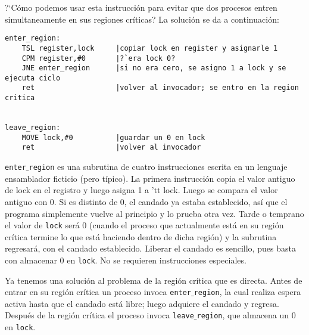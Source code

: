 \documentclass{article}
\begin{document}
?`C\'omo podemos usar esta instrucci\'on para evitar que dos procesos 
entren simultaneamente en sus regiones cr\'iticas? La soluci\'on se da a 
continuaci\'on:
\begin{verbatim}
enter_region:
    TSL register,lock     |copiar lock en register y asignarle 1
    CPM register,#0       |?`era lock 0?
    JNE enter_region      |si no era cero, se asigno 1 a lock y se ejecuta ciclo
    ret                   |volver al invocador; se entro en la region critica


leave_region:
    MOVE lock,#0          |guardar un 0 en lock
    ret                   |volver al invocador
\end{verbatim}
{\tt enter$\_$region} es una subrutina de cuatro instrucciones escrita 
en un lenguaje ensamblador ficticio (pero t\'ipico). La primera instrucci\'on 
copia el valor antiguo de lock en el registro y luego asigna 1 a {'tt lock}. 
Luego se compara el valor antiguo con 0. Si es distinto de 0, el candado ya 
estaba establecido, as\'i que el programa simplemente vuelve al principio 
y lo prueba otra vez. Tarde o temprano el valor de {\tt lock} ser\'a 0 
(cuando el proceso que actualmente est\'a en su regi\'on cr\'itica termine 
lo que est\'a haciendo dentro de dicha regi\'on) y la subrutina regresar\'a, 
con el candado establecido. Liberar el candado es sencillo, pues basta con 
almacenar 0 en {\tt lock}. No se requieren instrucciones especiales.

Ya tenemos una soluci\'on al problema de la regi\'on cr\'itica que es 
directa. Antes de entrar en su regi\'on cr\'itica un proceso invoca 
{\tt enter$\_$region}, la cual realiza espera activa hasta que el candado 
est\'a libre; luego adquiere el candado y regresa. Despu\'es de la regi\'on 
cr\'itica el proceso invoca {\tt leave$\_$region}, que almacena un 0 en 
{\tt lock}.
\end{document}
